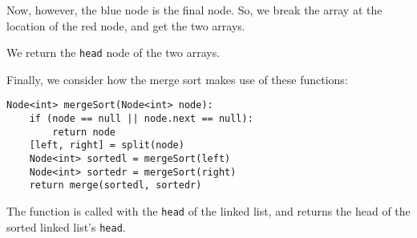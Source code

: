 \documentclass[a4paper, openany]{memoir}
\begin{document}
Now, however, the blue node is the final node. So, we break the array at the location of the red node, and get the two arrays.
\begin{center}
\end{center}
We return the \texttt{head} node of the two arrays.

\noindent Finally, we consider how the merge sort makes use of these functions:
\begin{lstlisting}[language=pseudocode]
Node<int> mergeSort(Node<int> node):
    if (node == null || node.next == null):
        return node
    [left, right] = split(node)
    Node<int> sortedl = mergeSort(left)
    Node<int> sortedr = mergeSort(right)
    return merge(sortedl, sortedr)
\end{lstlisting}
The function is called with the \texttt{head} of the linked list, and returns the head of the sorted linked list's \texttt{head}.
\end{document}
